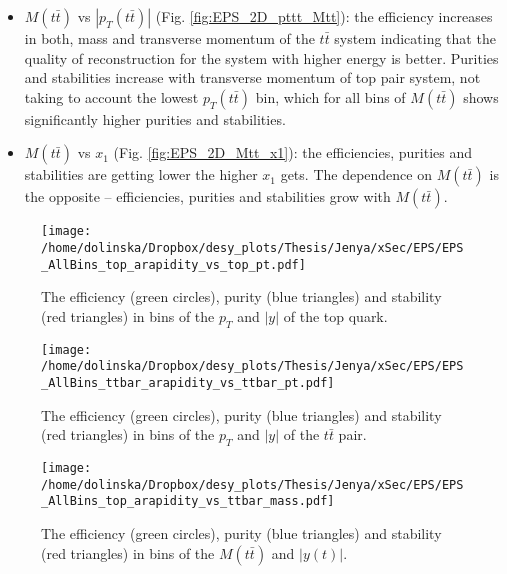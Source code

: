 \begin{itemize}
 \item $M(t\bar{t})$ vs $|p_{T}(t\bar{t})|$ (Fig. \ref{fig:EPS_2D_pttt_Mtt}): the efficiency increases in both, mass and transverse momentum of the $t\bar{t}$ system 
 indicating that the quality of reconstruction for the system with higher energy is better. Purities and stabilities increase with transverse momentum of top pair 
 system, not taking to account the lowest $p_{T}(t\bar{t})$ bin, which for all bins of $M(t\bar{t})$ shows significantly higher purities and stabilities.
 
 \item $M(t\bar{t})$ vs $x_{1}$ (Fig. \ref{fig:EPS_2D_Mtt_x1}): the efficiencies, purities and stabilities are getting lower the higher $x_{1}$ gets. The dependence 
 on $M(t\bar{t})$ is the opposite -- efficiencies, purities and stabilities grow with $M(t\bar{t})$.
\end{itemize}

% 

\begin{figure}[h]
  \centering
  \texttt{[image: /home/dolinska/Dropbox/desy\_plots/Thesis/Jenya/xSec/EPS/EPS\_AllBins\_top\_arapidity\_vs\_top\_pt.pdf]}
  \caption{The efficiency (green circles), purity (blue triangles) and stability (red triangles) in bins of the $p_{T}$ and $|y|$ of the top quark.}
  \label{fig:EPS_2D_y_pt_ap}
\end{figure}

\begin{figure}[p]
  \centering
  \texttt{[image: /home/dolinska/Dropbox/desy\_plots/Thesis/Jenya/xSec/EPS/EPS\_AllBins\_ttbar\_arapidity\_vs\_ttbar\_pt.pdf]}
  \caption{The efficiency (green circles), purity (blue triangles) and stability (red triangles) in bins of the $p_{T}$ and $|y|$ of the $t\bar{t}$ pair.}
  \label{fig:EPS_2D_ptt_ytt}
\end{figure}

\begin{figure}[p]
  \centering
  \texttt{[image: /home/dolinska/Dropbox/desy\_plots/Thesis/Jenya/xSec/EPS/EPS\_AllBins\_top\_arapidity\_vs\_ttbar\_mass.pdf]}
  \caption{The efficiency (green circles), purity (blue triangles) and stability (red triangles) in bins of the $M(t\bar{t})$ and $|y(t)|$.}
  \label{fig:EPS_2D_Mtt_yt}
\end{figure}

